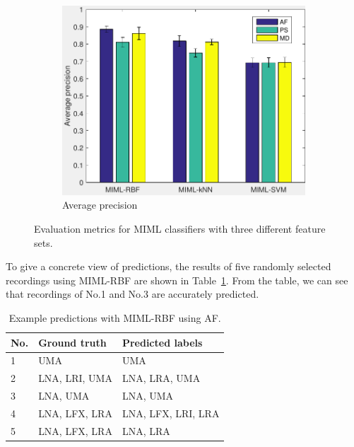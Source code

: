 \begin{figure}[htb!]
\begin{subfigure}[b]{0.45\textwidth}
                \includegraphics[width=\textwidth]{image/Ch6/avgPrecision.pdf}  
                     \caption{Average precision}         
        \end{subfigure}      
\caption[MIML classification results]{Evaluation metrics for MIML classifiers with three different feature sets.}
        \label{fig:classificationResults}
\end{figure}

To give a concrete view of predictions, the results of five randomly selected recordings using MIML-RBF are shown in Table~\ref{tab:prediction}. From the table, we can see that recordings of No.1 and No.3 are accurately predicted. 

\begin{table}[htb!]
\centering
\caption{Example predictions with MIML-RBF using AF.}
\label{tab:prediction}
\begin{tabular}{lll}
\hline\hline
{\bf No.} &{\bf Ground truth} & {\bf Predicted labels} \\ \hline
1&UMA                & UMA                    \\ 
2&LNA, LRI, UMA      & LNA, LRA, UMA          \\ 
3&LNA, UMA           & LNA, UMA               \\ 
4&LNA, LFX, LRA      & LNA, LFX, LRI, LRA     \\ 
5&LNA, LFX, LRA      & LNA, LRA               \\ \hline\hline
\end{tabular}
\end{table}


